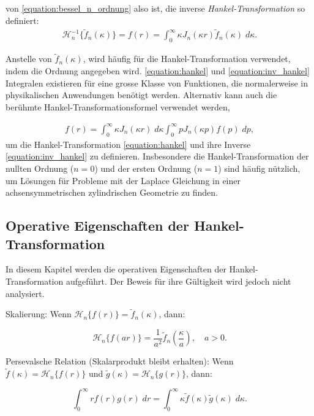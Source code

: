 von \eqref{equation:bessel_n_ordnung} also ist, die inverse \textit{Hankel-Transformation} so definiert:
\begin{align}
	\mathscr{H}^{-1}_n\{\tilde{f}_n(\kappa)\}=f(r)=\int_{0}^{\infty}\kappa J_n(\kappa r) \tilde{f}_n(\kappa) \; d\kappa.
	\label{equation:inv_hankel}
\end{align}

Anstelle von $\tilde{f}_n(\kappa)$, wird häufig für die Hankel-Transformation verwendet, indem die Ordnung angegeben wird.
\eqref{equation:hankel} und \eqref{equation:inv_hankel} Integralen existieren für eine grosse Klasse von Funktionen, die normalerweise in physikalischen Anwendungen benötigt werden.
Alternativ kann auch die berühmte Hankel-Transformationsformel verwendet werden, 

\begin{align*}
	f(r) = \int_{0}^{\infty}\kappa J_n(\kappa r) \; d\kappa \int_{0}^{\infty} p J_n(\kappa p)f(p) \; dp,
	\label{equation:hankel_integral_formula}
\end{align*}
um die Hankel-Transformation \eqref{equation:hankel} und ihre Inverse \eqref{equation:inv_hankel} zu definieren.
Insbesondere die Hankel-Transformation der nullten Ordnung ($n=0$) und der ersten Ordnung ($n=1$) sind häufig nützlich, um Lösungen für Probleme mit der Laplace Gleichung in einer achsensymmetrischen zylindrischen Geometrie zu finden.

\subsection{Operative Eigenschaften der Hankel-Transformation\label{sub:op_properties_hankel}}
In diesem Kapitel werden die operativen Eigenschaften der Hankel-Transformation aufgeführt. Der Beweis für ihre Gültigkeit wird jedoch nicht analysiert.

\begin{satz}{Skalierung:}
	Wenn $\mathscr{H}_n\{f(r)\}=\tilde{f}_n(\kappa)$, dann:
	
	\begin{equation*}
		\mathscr{H}_n\{f(ar)\}=\frac{1}{a^{2}}\tilde{f}_n \left(\frac{\kappa}{a}\right), \quad a>0.
	\end{equation*}
\end{satz}

\begin{satz}{Persevalsche Relation (Skalarprodukt bleibt erhalten):}
Wenn $\tilde{f}(\kappa)=\mathscr{H}_n\{f(r)\}$ und $\tilde{g}(\kappa)=\mathscr{H}_n\{g(r)\}$, dann:

\begin{equation*}
	\int_{0}^{\infty}rf(r)g(r) \; dr = \int_{0}^{\infty}\kappa\tilde{f}(\kappa)\tilde{g}(\kappa) \; d\kappa.
\end{equation*}
\end{satz}

